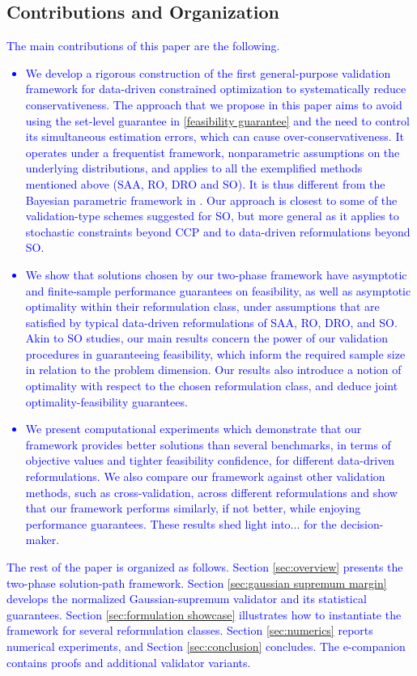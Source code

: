\documentclass[mnsc,blindrev]{informs4} %
\newcommand{\dl}[1]{\textcolor{blue}{#1}}
\begin{document}
\subsection{Contributions and Organization}
\dl{The main contributions of this paper are the following.
\begin{itemize}
    \item We develop a rigorous construction of the first general-purpose validation framework for data-driven constrained optimization to systematically reduce conservativeness. The approach that we propose in this paper aims to avoid using the set-level guarantee in \eqref{feasibility guarantee} and the need to control its simultaneous estimation errors, which can cause over-conservativeness. It operates under a frequentist framework, nonparametric assumptions on the underlying distributions, and applies to all the exemplified methods mentioned above (SAA, RO, DRO and SO). It is thus different from the Bayesian parametric framework in \cite{gupta2019near}. Our approach is closest to some of the validation-type schemes suggested for SO, but more general as it applies to stochastic constraints beyond CCP and to data-driven reformulations beyond SO.
    \item We show that solutions chosen by our two-phase framework have asymptotic and finite-sample performance guarantees on feasibility, as well as asymptotic optimality within their reformulation class, under assumptions that are satisfied by typical data-driven reformulations of SAA, RO, DRO, and SO. Akin to SO studies, our main results concern the power of our validation procedures in guaranteeing feasibility, which inform the required sample size in relation to the problem dimension. Our results also introduce a notion of optimality with respect to the chosen reformulation class, and deduce joint optimality-feasibility guarantees.
    \item We present computational experiments which demonstrate that our framework provides better solutions than several benchmarks, in terms of objective values and tighter feasibility confidence, for different data-driven reformulations. We also compare our framework against other validation methods, such as cross-validation, across different reformulations and show that our framework performs similarly, if not better, while enjoying performance guarantees. These results shed light into... for the decision-maker.
\end{itemize}
}
\dl{The rest of the paper is organized as follows. Section \ref{sec:overview} presents the two-phase solution-path framework. Section \ref{sec:gaussian supremum margin} develops the normalized Gaussian-supremum validator and its statistical guarantees. Section \ref{sec:formulation showcase} illustrates how to instantiate the framework for several reformulation classes. Section \ref{sec:numerics} reports numerical experiments, and Section \ref{sec:conclusion} concludes. The e-companion contains proofs and additional validator variants.}
\end{document}
